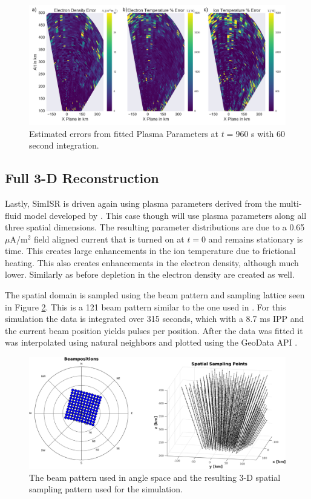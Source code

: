 \documentclass[draft,ras]{agutex}
\begin{document}
\begin{article}
\begin{figure}[!t]
\centering
\includegraphics[width=6in]{0960_60_int_err}
\caption{Estimated errors from fitted Plasma Parameters at $t=960$ s with 60 second integration.}
\label{fig:fplparamst60err}
\end{figure}

\subsection{Full 3-D Reconstruction}

Lastly, SimISR is driven again using plasma parameters derived from the multi-fluid model developed by \cite{semeter:plasmatransport2012}. This case though will use plasma parameters along all three spatial dimensions. The resulting parameter distributions are due to a 0.65 $\mu$A/m$^2$ field aligned current that is turned on at $t=0$ and remains stationary is time. This creates large enhancements in the ion temperature due to frictional heating. This also creates enhancements in the electron density, although much lower. Similarly as before depletion in the electron density are created as well.

The spatial domain is sampled using the beam pattern and sampling lattice seen in Figure \ref{fig:3dsampling}. This is a 121 beam pattern similar to the one used in \cite{Semeter:2008hs}. For this simulation the data is integrated over 315 seconds, which with a 8.7 ms IPP and the current beam position yields pulses per position. After the data was fitted it was interpolated using natural neighbors and plotted using the GeoData API \citep{john_swoboda_2016_154536}.

\begin{figure}[!t]
\centering
\includegraphics[width=6in]{Sampling3d}
\caption{The beam pattern used in angle space and the resulting 3-D spatial sampling pattern used for the simulation.}
\label{fig:3dsampling}
\end{figure}


\end{article}
\end{document}
